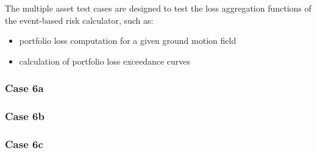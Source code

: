 The multiple asset test cases are designed to test the loss aggregation functions of the event-based risk calculator, such as:

\begin{itemize}
\item portfolio loss computation for a given ground motion field
\item calculation of portfolio loss exceedance curves
\end{itemize}

\subsubsection{Case 6a}

% 

\subsubsection{Case 6b}

% 

\subsubsection{Case 6c}

% 

